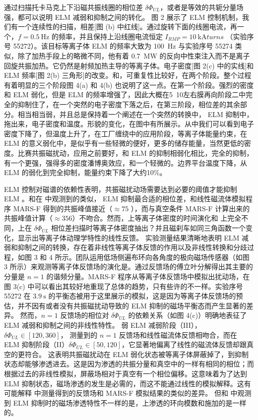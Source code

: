 通过扫描托卡马克上下沿磁共振线圈的相位差 $\delta\Phi_{UL}$，或者是等效的共轭分量场强，都可以说明 ELM 减弱和抑制之间的转化。
图 2 展示了 ELM 控制机制，我们有一个连续性的扫描，相差[图 (b) 中红线]。通过旋转下面的线圈电流，再一个，$f=\SI{0.5}{\hertz}$ 的频率，并且保持上沿线圈电流恒定 $I_{RMP}= \SI{10}{\kilo\ampere turns}$ （实验序号 55272）。该目标等离子体 ELM 的频率大致为 \SI{100}{\hertz} 与实验序号 55274 类似，除了加热手段上的略微不同，他有着 \SI{0.7}{\mega\watt} 的反向中性束注入而不是离子回旋共振加热。它仍然是射频加热主导的等离子体。电子密度[图 2(c) 中的实线]和 ELM 频率[图 2(b) 三角形]的改变。和，可重复性比较好，在两个阶段。整个过程有着明显的三个阶段图 4(a) 和 4(b) 也说明了这一点。在第一个阶段。强烈的密度和 ELM 弱化，但是 ELM 的频率增强了，因此大概在5~10左右膜再向阶段二中完全的抑制住了，在一个突然的电子密度下落之后，在第三阶段，相位差的其余部分。相当相当弱，并且总是保持着一个阐述在一个突然的转换中， ELM 抑制中，拖出来，电子密度和温度。形貌的变化，在图中有所展示。从中我们可以看到电子密度下降了，但温度上升了，在工厂缠绕中的应用阶段，等离子体能量约束，在 ELM 的意义弱化中，是似乎有一些轻微的便好，更多的储存能量，当然更低的密度。比赛共振磁扰动，应用之前要好，和 ELM 的抑制相弱化相比，完全的抑制，有一个更强，强得多的密度潘博奥效应，和一个轻微的。边界平台温度下降，从 ELM 的弱化到完全抑制，能量约束下降了大约10\%。

 ELM 控制对磁谱的依赖性表明，共振磁扰动场需要达到必要的阈值才能抑制 ELM 。和在 \ddd 中观测到的类似， ELM 抑制最合适的相位差，和线性磁流体模拟程序 MARS-F 得到的共振峰值接近（$\approx 75$ \degree），而与真空条件 MARS-F 计算出来的共振峰值计算（$\approx 356$\degree）不吻合。然而，\east 上等离子体密度的时间演化和 \ddd 上完全不同，\ddd 上在 $\delta\Phi_{UL}$ 相位差扫描时等离子体密度抽出？并且磁刹车如同三角函数一个变化，显示出等离子体动理学特性的线性反馈。
实验测量结果清晰地表明 ELM 减弱和抑制之间的转换，存在着非线性等离子体反馈的作用以及非线性转换和分歧过程，如图 3 和 4 所示。\east 团队运用低场侧遍布环向各角度的极向磁场传感器（如图 3 所示）来观测等离子体反馈场的演化是。通过反馈场的傅立叶分解得出其主要的分量是 $n=1$ 的谐频分量。MARS-F 程序从等离子体反馈场中模拟出扰动场，在图 3(c) 中可以看出其较好地重现了总体的趋势，只有些许的不一样。实验序号 55272 在 $\SI{3.9}{\second}$ 的平衡态被用于这里展示的模拟，这是因为等离子体反馈场的预估，并不因有或者没有共振磁扰动导致的 ELM 抑制的磁场平衡态而产生显著的差异。
然而，$n=1$ 反馈场的相位对 $\delta\Phi_{UL}$ 的依赖关系（如图 4(c)）明确地表征了 ELM 减弱和抑制之间的非线性特性。
弱 ELM 减弱阶段（III），$\delta\Phi_{UL}\in [120,360]$\degree， 测量到的 $n=1$ 反馈场和线性磁流体反馈相吻合，而在 ELM 抑制阶段（II）$\delta\Phi_{UL}\in [50,120]$\degree，它显著地偏离了线性的磁流体反馈却跟真空的更符合。
这表明共振磁扰动在 ELM 弱化状态被等离子体屏蔽掉了，到抑制状态却能够渗透进去。这是因为渗透的共振分量和真空中的一样有相同的相位；而根据过去的非线性模拟，屏蔽场相对于真空有一个相位偏移。这意味着为了达到 ELM 抑制状态，磁场渗透的发生是必需的，而这不能通过线性的模拟解释。这有可能解释 \ddd 中测量得到的反馈场和 MARS-F 模拟结果的类似的差异。
但和 \ddd 中观测到 ELM 抑制时的磁场渗透特性不一样的是，\east 上渗透的环向模数和施加的是一样的。



